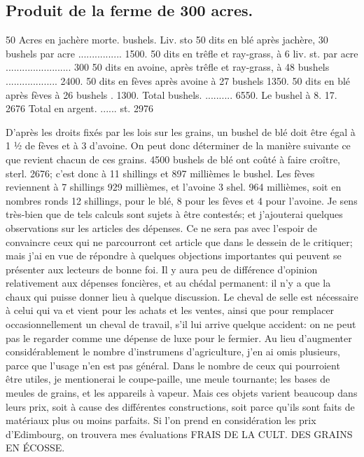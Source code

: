 \subsection{Produit de la ferme de 300 acres.}
50 Acres en jachère morte. bushels. Liv. sto
50 dits en blé après jachère, 30 bushels par acre ................ 1500.
50 dits en trêfle et ray-grass, à 6 liv. st. par acre ........................ 300
50 dits en avoine, après trêfle et ray-grass, à 48 bushels ................... 2400.
50 dits en fèves après avoine à 27 bushels 1350.
50 dits en blé après fèves à 26 bushels . 1300.
Total bushels. .......... 6550.
Le bushel à 8. 17. 2676
Total en argent. ...... st. 2976

D'après les droits fixés par les lois sur les grains, un bushel de blé doit être égal à 1 ½ de fèves et à 3 d'avoine. On peut donc déterminer de la manière suivante ce que revient chacun de ces grains. 4500 bushels de blé ont coûté à faire croître, sterl. 2676; c'est donc à 11 shillings et 897 millièmes le bushel. Les fèves reviennent à 7 shillings 929 millièmes, et l'avoine 3 shel. 964 millièmes, soit en nombres ronds 12 shillings, pour le blé, 8 pour les fèves et 4 pour l'avoine.
Je sens très-bien que de tels calculs sont sujets à être contestés; et j'ajouterai quelques observations sur les articles des dépenses.\setcounter{page}{314} Ce ne sera pas avec l'espoir de convaincre ceux qui ne parcourront cet article que dans le dessein de le critiquer; mais j'ai en vue de répondre à quelques objections importantes qui peuvent se présenter aux lecteurs de bonne foi.
Il y aura peu de différence d'opinion relativement aux dépenses foncières, et au chédal permanent: il n'y a que la chaux qui puisse donner lieu à quelque discussion. Le cheval de selle est nécessaire à celui qui va et vient pour les achats et les ventes, ainsi que pour remplacer occasionnellement un cheval de travail, s'il lui arrive quelque accident: on ne peut pas le regarder comme une dépense de luxe pour le fermier. Au lieu d'augmenter considérablement le nombre d'instrumens d'agriculture, j'en ai omis plusieurs, parce que l'usage n'en est pas général. Dans le nombre de ceux qui pourroient être utiles, je mentionerai le coupe-paille, une meule tournante; les bases de meules de grains, et les appareils à vapeur. Mais ces objets varient beaucoup dans leurs prix, soit à cause des différentes constructions, soit parce qu'ils sont faits de matériaux plus ou moins parfaits.
Si l'on prend en considération les prix d'Edimbourg, on trouvera mes évaluations\setcounter{page}{315} FRAIS DE LA CULT. DES GRAINS EN ÉCOSSE.
